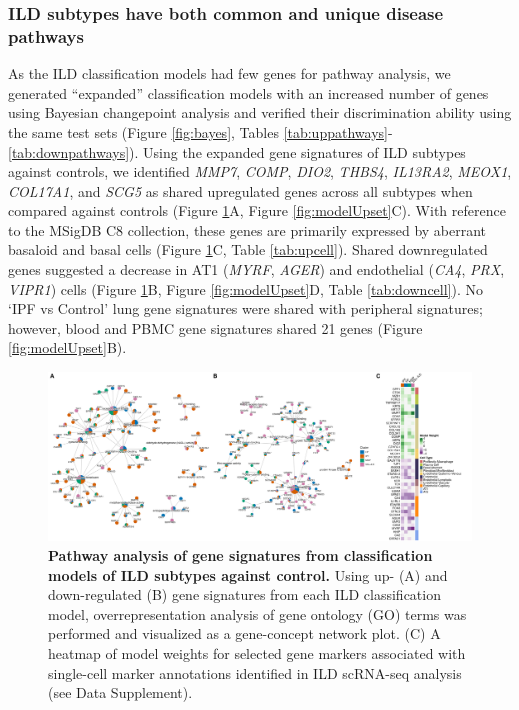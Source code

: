 \documentclass[
]{article}
\begin{document}
\subsubsection{ILD subtypes have both common and unique disease pathways}\label{ild-subtypes-have-both-common-and-unique-disease-pathways}

As the ILD classification models had few genes for pathway analysis, we generated ``expanded'' classification models with an increased number of genes using Bayesian changepoint analysis and verified their discrimination ability using the same test sets (Figure \ref{fig:bayes}, Tables \ref{tab:uppathways}-\ref{tab:downpathways}). Using the expanded gene signatures of ILD subtypes against controls, we identified \textit{MMP7}, \textit{COMP}, \textit{DIO2}, \textit{THBS4}, \textit{IL13RA2}, \textit{MEOX1}, \textit{COL17A1}, and \textit{SCG5} as shared upregulated genes across all subtypes when compared against controls (Figure \ref{fig:ILDpathways}A, Figure \ref{fig:modelUpset}C). With reference to the MSigDB C8 collection, these genes are primarily expressed by aberrant basaloid and basal cells (Figure \ref{fig:ILDpathways}C, Table \ref{tab:upcell}). Shared downregulated genes suggested a decrease in AT1 (\textit{MYRF}, \textit{AGER}) and endothelial (\textit{CA4}, \textit{PRX}, \textit{VIPR1}) cells (Figure \ref{fig:ILDpathways}B, Figure \ref{fig:modelUpset}D, Table \ref{tab:downcell}). No `IPF vs Control' lung gene signatures were shared with peripheral signatures; however, blood and PBMC gene signatures shared 21 genes (Figure \ref{fig:modelUpset}B).



\begin{figure}

{\centering \includegraphics[width=1\linewidth,]{./Figures/SysReview/Figure5_pathways} 

}

\caption[ILD pathways]{\textbf{Pathway analysis of gene signatures from classification models of ILD subtypes against control.} Using up- (A) and down-regulated (B) gene signatures from each ILD classification model, overrepresentation analysis of gene ontology (GO) terms was performed and visualized as a gene-concept network plot. (C) A heatmap of model weights for selected gene markers associated with single-cell marker annotations identified in ILD scRNA-seq analysis (see Data Supplement).}\label{fig:ILDpathways}
\end{figure}
\end{document}
